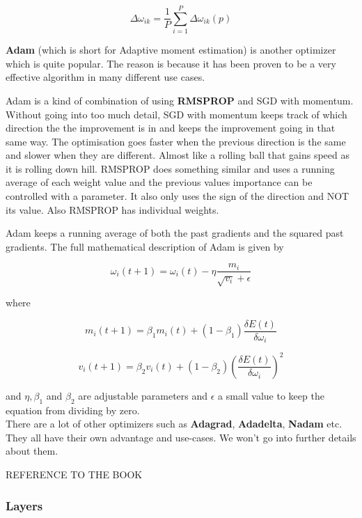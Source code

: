 \[ \Delta\omega_{ik} = \frac{1}{P}  \displaystyle\sum_{i=1}^{P} \Delta\omega_{ik}(p) \]

\textbf{Adam} (which is short for Adaptive moment estimation) is another optimizer which is quite popular.
The reason is because it has been proven to be a very effective algorithm in many different use cases.

Adam is a kind of combination of using \textbf{RMSPROP} and SGD with momentum.
Without going into too much detail, SGD with momentum keeps track of which direction the the improvement is in and keeps the improvement going in that same way. The optimisation goes faster when the previous direction is the same and slower when they are different. Almost like a rolling ball that gains speed as it is rolling down hill.
RMSPROP does something similar and uses a running average of each weight value and the previous values importance can be controlled with a parameter. It also only uses the sign of the direction and NOT its value. Also RMSPROP has individual weights.

Adam keeps a running average of both the past gradients and the squared past gradients.
The full mathematical description of Adam is given by

\[ \omega_i (t+1) = \omega_i(t) - \eta \frac{m_i}{\sqrt{v_i} + \epsilon} \]

where

\[ m_i (t+1) = \beta_1m_i(t) + (1 - \beta_1) \frac{ \delta E(t) }{\delta\omega_i} \]

\[ v_i (t+1) = \beta_2v_i(t) + (1 - \beta_2) (\frac{ \delta E(t) }{\delta\omega_i})^2 \]

and $ \eta, \beta_1 $ and $ \beta_2 $ are adjustable parameters and $ \epsilon $ a small value to keep the equation from dividing by zero.\\

There are a lot of other optimizers such as \textbf{Adagrad}, \textbf{Adadelta}, \textbf{Nadam} etc. They all have their own advantage and use-cases. We won't go into further details about them.

REFERENCE TO THE BOOK

\subsubsection{Layers}


